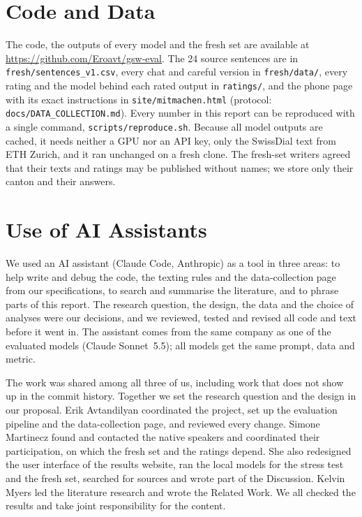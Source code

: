 \documentclass[11pt]{article}
\begin{document}
\section*{Code and Data}
The code, the outputs of every model and the fresh set are available at
\url{https://github.com/Eroavt/gsw-eval}. The 24 source sentences are in
\texttt{fresh/sentences\_v1.csv}, every chat and careful version in \texttt{fresh/data/}, every
rating and the model behind each rated output in \texttt{ratings/}, and the phone page with its
exact instructions in \texttt{site/mitmachen.html} (protocol: \texttt{docs/DATA\_COLLECTION.md}). Every number in this report can be reproduced with a
single command, \texttt{scripts/reproduce.sh}. Because all model outputs are cached, it needs neither
a GPU nor an API key, only the SwissDial text from ETH Zurich, and it ran unchanged on a fresh clone.
The fresh-set writers agreed that their texts and ratings may be published without names; we store
only their canton and their answers.

\section*{Use of AI Assistants}
We used an AI assistant (Claude Code, Anthropic) as a tool in three areas: to help write and debug
the code, the texting rules and the data-collection page from our specifications, to search and
summarise the literature, and to phrase parts of this report. The research question, the design,
the data and the choice of analyses were our decisions, and we reviewed, tested and revised all code
and text before it went in. The assistant comes from the same company as one of the evaluated models
(Claude Sonnet~5.5); all models get the same prompt, data and metric.

The work was shared among all three of us, including work that does not show up in the commit
history. Together we set the research question and the design in our proposal. Erik Avtandilyan
coordinated the project, set up the evaluation pipeline and the data-collection page, and reviewed
every change. Simone Martinecz found and contacted the native speakers and coordinated their
participation, on which the fresh set and the ratings depend. She also redesigned the user interface
of the results website, ran the local models for the stress test and the fresh set, searched for
sources and wrote part of the Discussion. Kelvin Myers led the literature research and wrote the
Related Work. We all checked the results and take joint responsibility for the content.


\end{document}
